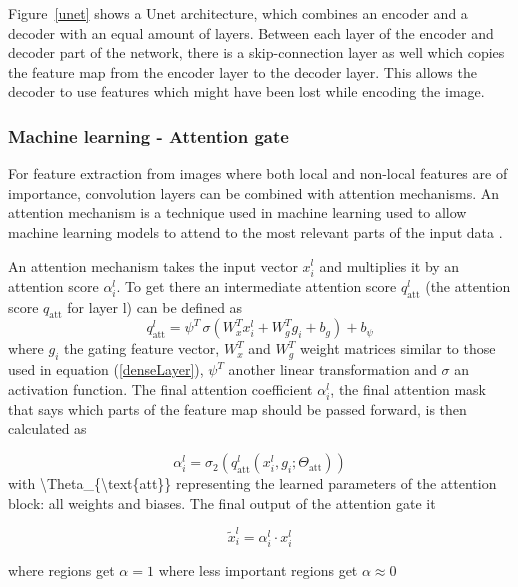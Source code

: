 \documentclass{article}
\begin{document}
Figure~\ref{unet} shows a Unet architecture, which combines an encoder and a decoder with an equal amount of layers. Between each layer of the encoder and decoder part of the network, there is a skip-connection layer as well which copies the feature map from the encoder layer to the decoder layer. This allows the decoder to use features which might have been lost while encoding the image.

\subsubsection{Machine learning - Attention gate}

For feature extraction from images where both local and non-local features are of importance, convolution layers can be combined with attention mechanisms. An attention mechanism is a technique used in machine learning used to allow machine learning models to attend to the most relevant parts of the input data \citep{vaswani2017attention}.

An attention mechanism takes the input vector $x_{i}^{l}$ and multiplies it by an attention score $\alpha_{i}^{l}$. To get there an intermediate attention score $q_{\text{att}}^{l}$ (the attention score $q_{\text{att}}$ for layer l) can be defined as
\begin{equation}
q_{\text{att}}^{l} = \psi^{T} \, \sigma \left( W_{x}^{T} x_{i}^{l} + W_{g}^{T} g_{i} + b_{g} \right) + b_{\psi}
\end{equation}
where $g_{i}$ the gating feature vector, $W_{x}^{T}$ and $W_{g}^{T}$ weight matrices similar to those used in equation (\ref{denseLayer}), $\psi^{T}$ another linear transformation and $\sigma$ an activation function. The final attention coefficient $\alpha_{i}^{l}$, the final attention mask that says which parts of the feature map should be passed forward, is then calculated as

\begin{equation}
\alpha_{i}^{l} = \sigma_{2} \left( q_{\text{att}}^{l}(x_{i}^{l}, g_{i}; \Theta_{\text{att}}) \right)
\end{equation}
with {\textbackslash}Theta\_\{{\textbackslash}text\{att\}\} representing the learned parameters of the attention block: all weights and biases. The final output of the attention gate it

\begin{equation}
\tilde{x}_i^l = \alpha_i^l \cdot x_i^l
\end{equation}

where regions get $\alpha = 1$ where less important regions get $\alpha \approx 0$
\end{document}
